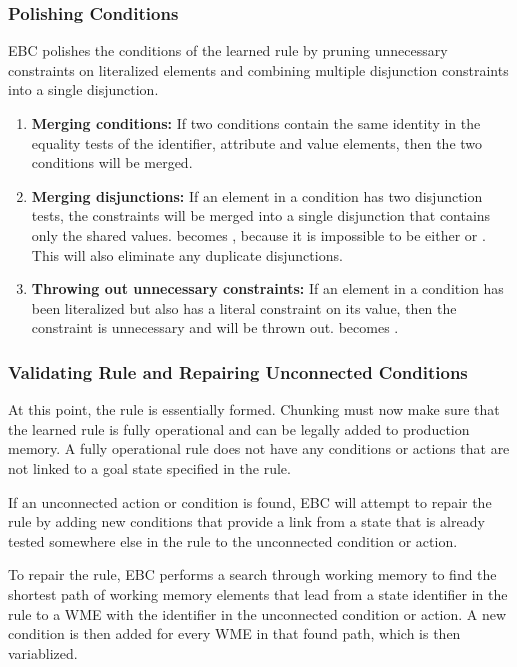 \subsubsection{Polishing Conditions}

EBC polishes the conditions of the learned rule by pruning unnecessary constraints on literalized elements and combining multiple disjunction constraints into a single disjunction.

\begin{enumerate}
	\item \textbf{Merging conditions:}
	If two conditions contain the same identity in the equality tests of the identifier, attribute and value elements, then the two conditions will be merged.

	\item \textbf{Merging disjunctions:} 
	If an element in a condition has two disjunction tests, the constraints will be merged into a single disjunction that contains only the shared values.  becomes , because it is impossible  to be either  or .  This will also eliminate any duplicate disjunctions.

	\item \textbf{Throwing out unnecessary constraints:} 
	If an element in a condition has been literalized but also has a literal constraint on its value, then the constraint is unnecessary and will be thrown out.   becomes .
\end{enumerate}

\subsubsection{Validating Rule and Repairing Unconnected Conditions}
At this point, the rule is essentially formed.  Chunking must now make sure that the learned rule is fully operational and can be legally added to production memory.  A fully operational rule does not have any conditions or actions that are not linked to a goal state specified in the rule. 

If an unconnected action or condition is found, EBC will attempt to repair the rule by adding new conditions that provide a link from a state that is already tested somewhere else in the rule to the unconnected condition or action.

To repair the rule, EBC performs a search through working memory to find the shortest path of working memory elements that lead from a state identifier in the rule to a WME with the identifier in the unconnected condition or action.  A new condition is then added for every WME in that found path, which is then variablized.

